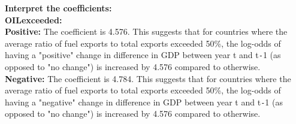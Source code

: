 \documentclass[12pt,letterpaper]{article}
\begin{document}
\begin{enumerate}
	\textbf{Interpret the coefficients:}\\
	\textbf{OILexceeded:}\\
	\textbf{Positive:} The coefficient is 4.576. This suggests that for countries where the average ratio of fuel exports to total exports exceeded 50\%, the log-odds of having a "positive" change in difference in GDP between year t and t\texttt{-}1 (as opposed to "no change") is increased by 4.576 compared to otherwise.\\
	\textbf{Negative:} The coefficient is 4.784. This suggests that for countries where the average ratio of fuel exports to total exports exceeded 50\%, the log-odds of having a "negative" change in difference in GDP between year t and t\texttt{-}1  (as opposed to "no change") is increased by 4.576 compared to otherwise.\\
	

\end{enumerate}
\end{document}
